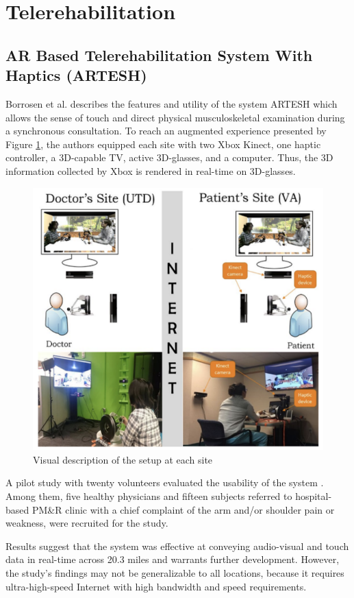 \section{Telerehabilitation}
\subsection{AR Based Telerehabilitation System With Haptics (ARTESH) }
Borrosen et al. \cite{borresen2019} describes the features and utility of the system ARTESH which allows the sense of touch and direct physical musculoskeletal examination during a synchronous consultation. To reach an augmented experience presented by Figure \ref{fig:borresen2019}, the authors equipped each site with two Xbox Kinect, one haptic controller, a 3D-capable TV,  active 3D-glasses, and a computer. Thus, the 3D information collected by Xbox is rendered in real-time on 3D-glasses. 

\begin{figure}[!hbt]
\begin{center}
\includegraphics[width=0.6 \textwidth]{img/cap3/borresen2019}
\caption{Visual description of the setup at each site \cite{borresen2019}}
\label{fig:borresen2019}
\end{center}
\end{figure}

A pilot study with twenty volunteers evaluated the usability of the system \cite{schutte2012}. Among them, five healthy physicians and fifteen subjects referred to hospital-based PM\&R clinic with a chief complaint of the arm and/or shoulder pain or weakness, were recruited for the study.

Results suggest that the system was effective at conveying audio-visual and touch data in real-time across 20.3 miles and warrants further development. However,  the study’s findings may not be generalizable to all locations, because it requires ultra-high-speed Internet with high bandwidth and speed requirements.

